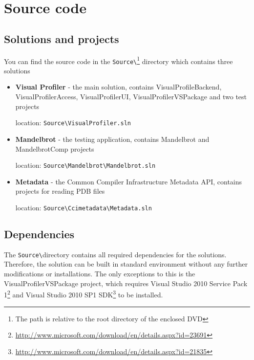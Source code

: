 \chapter{Source code}

\section{Solutions and projects}
You can find the source code in the \texttt{Source\textbackslash}\footnote{The path is relative to the root directory of the enclosed DVD} directory which contains three solutions
\begin{itemize}

\item \textbf{Visual Profiler} - the main solution, contains VisualProfileBackend, VisualProfilerAccess, VisualProfilerUI, VisualProfilerVSPackage and two test projects

location: \texttt{Source\textbackslash VisualProfiler.sln}\footnotemark[\value{footnote}]

\item \textbf{Mandelbrot} - the testing application, contains Mandelbrot and MandelbrotComp projects

location: \texttt{Source\textbackslash Mandelbrot\textbackslash  Mandelbrot.sln}\footnotemark[\value{footnote}]

\item \textbf{Metadata} - the Common Compiler Infrastructure Metadata API, contains projects for reading PDB files

location: \texttt{Source\textbackslash Ccimetadata\textbackslash  Metadata.sln}\footnotemark[\value{footnote}]

\end{itemize}

\section{Dependencies}
The \texttt{Source\textbackslash}\footnotemark[\value{footnote}] directory contains all required dependencies for the solutions. Therefore, the solution can be built in standard environment without any further modifications or installations. The only exceptions to this is the VisualProfilerVSPackage project, which requires Visual Studio 2010 Service Pack 1\footnote{\href{http://www.microsoft.com/download/en/details.aspx?id=23691}{http://www.microsoft.com/download/en/details.aspx?id=23691}} and Visual Studio 2010 SP1 SDK\footnote{\href{http://www.microsoft.com/download/en/details.aspx?id=21835}{http://www.microsoft.com/download/en/details.aspx?id=21835}} to be installed.

